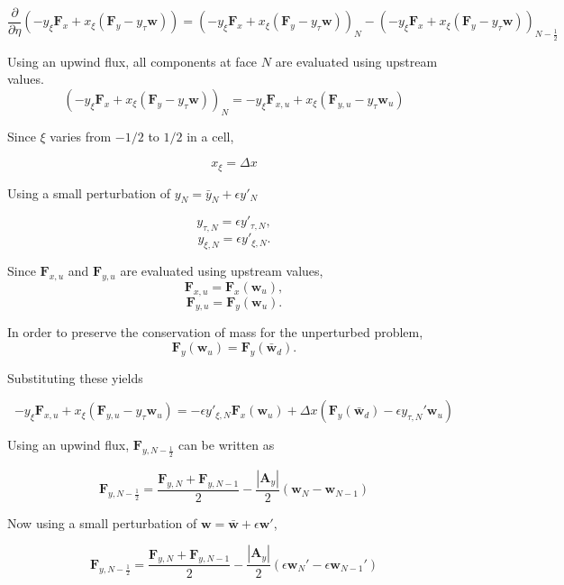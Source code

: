 \documentclass[10pt]{article}
\begin{document}
	$$ \frac{\partial}{\partial \eta} (-y_\xi \mathbf{F}_x + x_\xi (\mathbf{F}_y - y_\tau \mathbf{w})) =  (-y_\xi \mathbf{F}_x + x_\xi (\mathbf{F}_y - y_\tau \mathbf{w}))_{N} - (-y_\xi \mathbf{F}_x + x_\xi (\mathbf{F}_y - y_\tau \mathbf{w}))_{N-\frac{1}{2}} $$
	
	Using an upwind flux, all components at face $N$ are evaluated using upstream values.
	$$ (-y_\xi \mathbf{F}_x + x_\xi (\mathbf{F}_y - y_\tau \mathbf{w}))_{N} = -y_\xi \mathbf{F}_{x,u} + x_\xi (\mathbf{F}_{y,u} - y_\tau \mathbf{w}_u)$$
	
	Since $\xi$ varies from $-1/2$ to $1/2$ in a cell,
	
	$$ x_{\xi}= \Delta x$$
	
	Using a small perturbation of $y_N = \bar{y}_N + \epsilon y'_N$ %
	
	$$ y_{\tau,N} = \epsilon y'_{\tau,N}, $$ %
	$$ y_{\xi,N} = \epsilon y'_{\xi,N}. $$
	
	Since $\mathbf{F}_{x,u}$ and $\mathbf{F}_{y,u}$ are evaluated using upstream values, 
	$$ \mathbf{F}_{x,u} = \mathbf{F}_{x}(\mathbf{w}_u), $$
	$$ \mathbf{F}_{y,u} = \mathbf{F}_{y}(\mathbf{w}_u). $$
	
	In order to preserve the conservation of mass for the unperturbed problem,
	$$ \mathbf{F}_{y}(\mathbf{w}_u) = \mathbf{F}_{y}(\bar{\mathbf{w}}_d). $$
	
	Substituting these yields
	
	\begin{equation} \label{shock_term2_pt1}
		-y_\xi \mathbf{F}_{x,u} + x_\xi (\mathbf{F}_{y,u} - y_\tau \mathbf{w}_u) 
		= -\epsilon y'_{\xi,N} \mathbf{F}_{x}(\mathbf{w}_u) + \Delta x \left( \mathbf{F}_{y}(\bar{\mathbf{w}}_d) - \epsilon y_{\tau,N}' \mathbf{w}_u \right)
	\end{equation}
	
	
	Using an upwind flux, $\mathbf{F}_{y,N-\frac{1}{2}}$ can be written as
	
	$$ \mathbf{F}_{y,N-\frac{1}{2}} = \frac{\mathbf{F}_{y,N} + \mathbf{F}_{y,N-1}}{2} - \frac{|\mathbf{A}_y|}{2}(\mathbf{w}_{N} - \mathbf{w}_{N-1}) $$
	
	Now using a small perturbation of $\mathbf{w} = \bar{\mathbf{w}} + \epsilon \mathbf{w}'$, 
	
	$$ \mathbf{F}_{y,N-\frac{1}{2}} = \frac{\mathbf{F}_{y,N} + \mathbf{F}_{y,N-1}}{2} - \frac{|\mathbf{A}_y|}{2} (\epsilon \mathbf{w}_{N}' - \epsilon \mathbf{w}_{N-1}')$$
	
\end{document}
